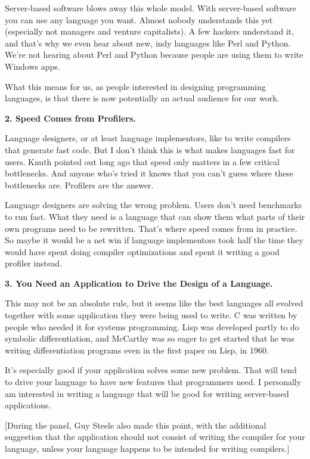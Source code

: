 Server-based software blows away this whole model. With server-based
software you can use any language you want. Almost nobody understands
this yet (especially not managers and venture capitalists). A few
hackers understand it, and that's why we even hear about new, indy
languages like Perl and Python. We're not hearing about Perl and Python
because people are using them to write Windows apps.

What this means for us, as people interested in designing programming
languages, is that there is now potentially an actual audience for our
work.

\textbf{2. Speed Comes from Profilers.}

Language designers, or at least language implementors, like to write
compilers that generate fast code. But I don't think this is what makes
languages fast for users. Knuth pointed out long ago that speed only
matters in a few critical bottlenecks. And anyone who's tried it knows
that you can't guess where these bottlenecks are. Profilers are the
answer.

Language designers are solving the wrong problem. Users don't need
benchmarks to run fast. What they need is a language that can show them
what parts of their own programs need to be rewritten. That's where
speed comes from in practice. So maybe it would be a net win if language
implementors took half the time they would have spent doing compiler
optimizations and spent it writing a good profiler instead.

\textbf{3. You Need an Application to Drive the Design of a Language.}

This may not be an absolute rule, but it seems like the best languages
all evolved together with some application they were being used to
write. C was written by people who needed it for systems programming.
Lisp was developed partly to do symbolic differentiation, and McCarthy
was so eager to get started that he was writing differentiation programs
even in the first paper on Lisp, in 1960.

It's especially good if your application solves some new problem. That
will tend to drive your language to have new features that programmers
need. I personally am interested in writing a language that will be good
for writing server-based applications.

{[}During the panel, Guy Steele also made this point, with the
additional suggestion that the application should not consist of writing
the compiler for your language, unless your language happens to be
intended for writing compilers.{]}


